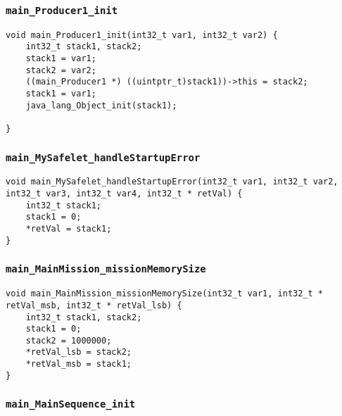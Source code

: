 \begin{landscape}
\begin{multicols}{2}
\subsubsection{\texttt{main\_Producer1\_init}}

\begin{lstlisting}[firstnumber=1318]
void main_Producer1_init(int32_t var1, int32_t var2) {
	int32_t stack1, stack2;
	stack1 = var1;
	stack2 = var2;
	((main_Producer1 *) ((uintptr_t)stack1))->this = stack2;
	stack1 = var1;
	java_lang_Object_init(stack1);

}
\end{lstlisting}

\subsubsection{\texttt{main\_MySafelet\_handleStartupError}}

\begin{lstlisting}[firstnumber=1328]
void main_MySafelet_handleStartupError(int32_t var1, int32_t var2, int32_t var3, int32_t var4, int32_t * retVal) {
	int32_t stack1;
	stack1 = 0;
	*retVal = stack1;
}
\end{lstlisting}

\subsubsection{\texttt{main\_MainMission\_missionMemorySize}}

\begin{lstlisting}[firstnumber=1407]
void main_MainMission_missionMemorySize(int32_t var1, int32_t * retVal_msb, int32_t * retVal_lsb) {
	int32_t stack1, stack2;
	stack1 = 0;
	stack2 = 1000000;
	*retVal_lsb = stack2;
	*retVal_msb = stack1;
}
\end{lstlisting}

\subsubsection{\texttt{main\_MainSequence\_init}}


\end{multicols}
\end{landscape}
